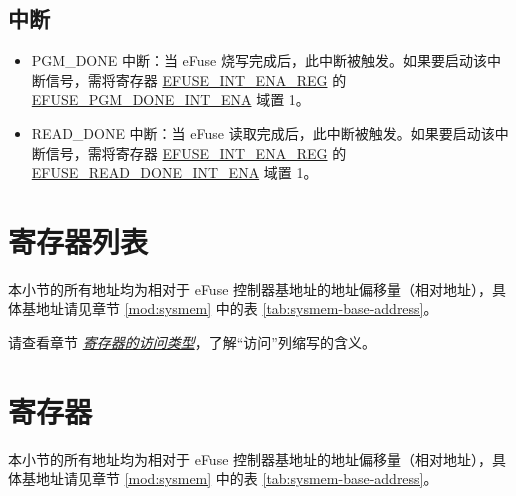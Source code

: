 \documentclass[main\_\_CN.tex]{subfiles}
\begin{document}





\subsection{中断}
\begin{itemize}
\item PGM\_DONE 中断：当 eFuse 烧写完成后，此中断被触发。如果要启动该中断信号，需将寄存器 \hyperref[regdesc:EFUSEINTENAREG]{EFUSE\_INT\_ENA\_REG} 的 \hyperref[fielddesc:EFUSEPGMDONEINTENA]{EFUSE\_PGM\_DONE\_INT\_ENA} 域置 1。
\item READ\_DONE 中断：当 eFuse 读取完成后，此中断被触发。如果要启动该中断信号，需将寄存器 \hyperref[regdesc:EFUSEINTENAREG]{EFUSE\_INT\_ENA\_REG} 的 \hyperref[fielddesc:EFUSEREADDONEINTENA]{EFUSE\_READ\_DONE\_INT\_ENA} 域置 1。
\end{itemize}




\clearpage
\section{寄存器列表}
\label{sec:efuse-reg-summ}
\hypertarget{efuse-reg-summ}{}

本小节的所有地址均为相对于 eFuse 控制器基地址的地址偏移量（相对地址），具体基地址请见章节 \ref{mod:sysmem} \textit{} 中的表 \ref{tab:sysmem-base-address}。

请查看章节 \hyperref[glossary-access-types]{\textit{寄存器的访问类型}}，了解“访问”列缩写的含义。





\clearpage
\section{寄存器}
\label{sec:register}

本小节的所有地址均为相对于 eFuse 控制器基地址的地址偏移量（相对地址），具体基地址请见章节 \ref{mod:sysmem} \textit{} 中的表 \ref{tab:sysmem-base-address}。


\end{document}
